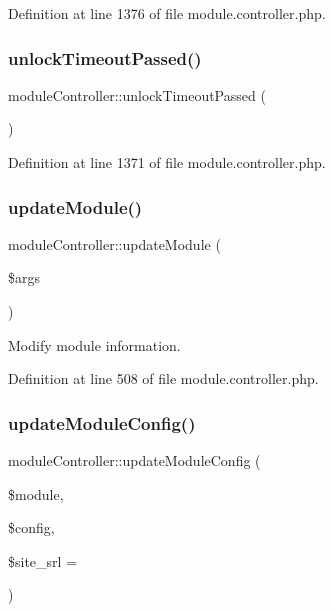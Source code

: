 Definition at line 1376 of file module.\+controller.\+php.

\hypertarget{classmoduleController_aac97ab294279631cb3cf1078063e8b56}{}\label{classmoduleController_aac97ab294279631cb3cf1078063e8b56} 
\subsubsection{\texorpdfstring{unlock\+Timeout\+Passed()}{unlockTimeoutPassed()}}
{\footnotesize\ttfamily module\+Controller\+::unlock\+Timeout\+Passed (\begin{DoxyParamCaption}{ }\end{DoxyParamCaption})}



Definition at line 1371 of file module.\+controller.\+php.

\hypertarget{classmoduleController_ae4a1e785f41aa56a626b7f72346bbe0c}{}\label{classmoduleController_ae4a1e785f41aa56a626b7f72346bbe0c} 
\subsubsection{\texorpdfstring{update\+Module()}{updateModule()}}
{\footnotesize\ttfamily module\+Controller\+::update\+Module (\begin{DoxyParamCaption}\item[{}]{\$args }\end{DoxyParamCaption})}



Modify module information. 



Definition at line 508 of file module.\+controller.\+php.

\hypertarget{classmoduleController_aa6d6239d1fd7c1f64f7061778ad4127b}{}\label{classmoduleController_aa6d6239d1fd7c1f64f7061778ad4127b} 
\subsubsection{\texorpdfstring{update\+Module\+Config()}{updateModuleConfig()}}
{\footnotesize\ttfamily module\+Controller\+::update\+Module\+Config (\begin{DoxyParamCaption}\item[{}]{\$module,  }\item[{}]{\$config,  }\item[{}]{\$site\+\_\+srl = {} }\end{DoxyParamCaption})}



